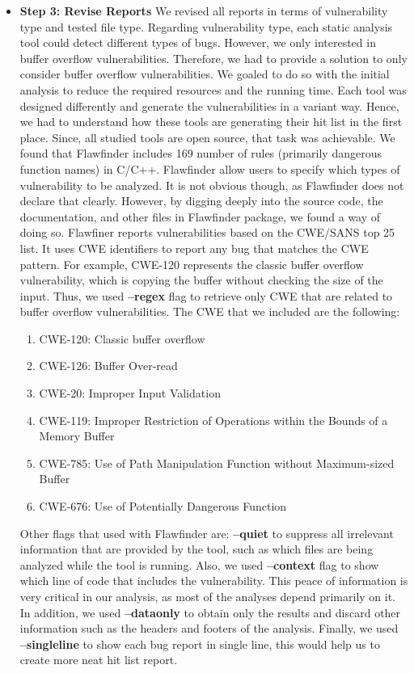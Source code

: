 \begin{itemize}[leftmargin=*]
\item  \textbf{ Step 3: Revise Reports}
We revised all reports in terms of vulnerability type and tested file type. Regarding vulnerability type, each static analysis tool could detect different types of bugs. However, we only interested in buffer overflow vulnerabilities. Therefore, we had to provide a solution to only consider buffer overflow vulnerabilities. We goaled to do so with the initial analysis to reduce the required resources and the running time. Each tool was designed differently and generate the vulnerabilities in a variant way. Hence, we had to understand how these tools are generating their hit list in the first place.  Since, all studied tools are open source, that task was achievable. We found that Flawfinder includes 169 number of rules (primarily dangerous function names) in C/C++. Flawfinder allow users to specify which types of vulnerability to be analyzed. It is not obvious though, as Flawfinder does not declare that clearly.  However, by digging deeply into the source code, the documentation, and other files in Flawfinder package, we found a way of doing so. Flawfiner reports vulnerabilities based on the CWE/SANS top 25 list. It uses CWE identifiers to report any bug that matches the CWE pattern. For example, CWE-120 represents the classic buffer overflow vulnerability, which is copying the buffer without checking the size of the input. Thus, we used \textbf{--regex} flag to retrieve only CWE that are related to buffer overflow vulnerabilities. The CWE that we included are the following:


\begin{enumerate}
\item CWE-120: Classic buffer overflow 
\item CWE-126: Buffer Over-read
\item CWE-20: Improper Input Validation
\item CWE-119: Improper Restriction of Operations within the Bounds of a Memory Buffer
\item CWE-785: Use of Path Manipulation Function without Maximum-sized Buffer
\item CWE-676: Use of Potentially Dangerous Function
\end{enumerate} 

Other flags that used with Flawfinder are: \textbf{--quiet} to suppress all irrelevant information that are provided by the tool, such as which files are being analyzed while the tool is running. Also, we used \textbf{--context} flag to show which line of code that includes the vulnerability. This peace of information is very critical in our analysis, as most of the analyses depend primarily on it. In addition, we used \textbf{--dataonly} to obtain only the results and discard other information such as the headers and footers of the analysis. Finally, we used \textbf{--singleline} to show each bug report in single line, this would help us to create more neat hit list report.



\end{itemize}
